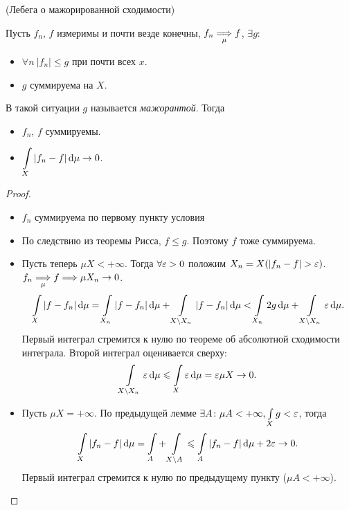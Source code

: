\begin{theorem}(Лебега о мажорированной сходимости)

    Пусть $f_n$, $f$ измеримы и почти везде конечны, $f_n \underset{\mu}{\Longrightarrow} f$, 
    $\exists g\colon~$
    \begin{itemize}
        \item $\forall n~ |f_n| \leqslant g$ при почти всех $x$.
        \item $g$ суммируема на $X$.
    \end{itemize} 
    В такой ситуации $g$ называется \textit{мажорантой}. Тогда
    \begin{itemize}
        \item $f_n$, $f$ суммируемы.
        \item $\displaystyle \int\limits_{X}{|f_n - f| \,\mathrm{d}\mu} \to 0$.
    \end{itemize} 
\end{theorem}
\begin{proof}
    \enewline
    \begin{itemize}
        \item $f_n$ суммируема по первому пункту условия
        \item По следствию из теоремы Рисса, $f \leqslant g$. Поэтому $f$ тоже суммируема.
        \item Пусть теперь $\mu{X} < +\infty$. Тогда $\forall \varepsilon > 0$ положим $X_n = X(|f_n - f| > \varepsilon)$.
            \\ $f_n \underset{\mu}{\Longrightarrow} f \Longrightarrow \mu{X_n} \to 0$.
            \[
                \int\limits_X{|f - f_n| \,\mathrm{d} \mu} = \int\limits_{X_n}{|f - f_n| \,\mathrm{d}\mu} 
                + \int\limits_{X \setminus X_n}{|f - f_n| \,\mathrm{d}\mu} <
                \int\limits_{X_n}{2g \,\mathrm{d}\mu} + \int\limits_{X \setminus X_n}{\varepsilon \,\mathrm{d}\mu}
            .\]
            Первый интеграл стремится к нулю по теореме об абсолютной сходимости интеграла.
            Второй интеграл оценивается сверху:
            \[
                \int\limits_{X \setminus X_n}{\varepsilon \,\mathrm{d}\mu} \leqslant \int\limits_{X}{\varepsilon\,\mathrm{d}\mu} = \varepsilon\mu{X} \to 0
            .\] 
        \item Пусть $\mu{X} = +\infty$. По предыдущей лемме $\exists A \colon \mu{A} < +\infty, 
            \int\limits_X{g} < \varepsilon$, тогда
            \[
                \int\limits_X{|f_n - f| \,\mathrm{d}\mu} = \int\limits_A + \int\limits_{X \setminus A} \leqslant
                \int\limits_A{|f_n - f| \,\mathrm{d}\mu} + 2\varepsilon \to 0
            .\]
            Первый интеграл стремится к нулю по предыдущему пункту ($\mu{A} < +\infty$).
    \end{itemize}
\end{proof}

